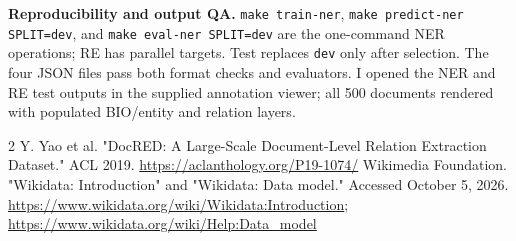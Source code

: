 \documentclass[10pt]{article}
\begin{document}
\textbf{Reproducibility and output QA.}
\texttt{make train-ner}, \texttt{make predict-ner SPLIT=dev}, and
\texttt{make eval-ner SPLIT=dev} are the one-command NER operations; RE has
parallel targets. Test replaces \texttt{dev} only after selection. The four
JSON files pass both format checks and evaluators. I opened the NER and RE test
outputs in the supplied annotation viewer; all 500 documents rendered with
populated BIO/entity and relation layers.

\begin{thebibliography}{2}\small
{} Y. Yao et al. "DocRED: A Large-Scale Document-Level Relation
Extraction Dataset." ACL 2019. \url{https://aclanthology.org/P19-1074/}
 Wikimedia Foundation. "Wikidata: Introduction" and
"Wikidata: Data model." Accessed October 5, 2026.
\url{https://www.wikidata.org/wiki/Wikidata:Introduction};
\url{https://www.wikidata.org/wiki/Help:Data_model}
\end{thebibliography}
\end{document}
